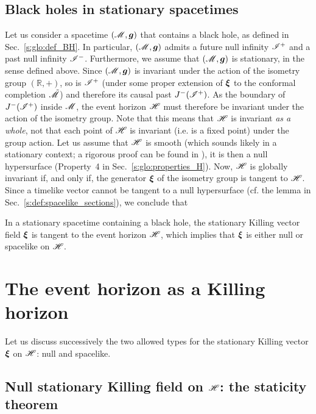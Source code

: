 \subsection{Black holes in stationary spacetimes}

Let us consider a spacetime $(\mathscr{M},\bm{g})$ that contains a black hole, as defined in
Sec.~\ref{s:glo:def_BH}. In particular, $(\mathscr{M},\bm{g})$ admits a future null
infinity $\mathscr{I}^+$ and a past null infinity $\mathscr{I}^-$.
Furthermore, we assume that $(\mathscr{M},\bm{g})$ is stationary, in the sense defined above.
Since $(\mathscr{M},\bm{g})$ is invariant under the action of the isometry group $(\mathbb{R},+)$,
so is $\mathscr{I}^+$ (under some proper extension of $\bm{\xi}$ to the conformal
completion $\tilde{\mathscr{M}}$)
and therefore its causal past $J^-(\mathscr{I}^+)$. As the boundary of $J^-(\mathscr{I}^+)$
inside $\mathscr{M}$, the event horizon $\mathscr{H}$ must therefore be invariant under the
action of the isometry group.
Note that this means that $\mathscr{H}$ is invariant \emph{as a whole}, not that
each point of $\mathscr{H}$ is invariant (i.e. is a fixed point) under the group action.
Let us assume that $\mathscr{H}$ is smooth (which sounds likely in a stationary context;
a rigorous proof can be found in \cite{ChrusDGH01}),
it is then a null hypersurface (Property~4 in Sec.~\ref{s:glo:properties_H}).
Now, $\mathscr{H}$ is globally invariant if, and only if, the
generator $\bm{\xi}$ of the isometry group is tangent to $\mathscr{H}$.
Since a timelike vector cannot be tangent to a null hypersurface (cf. the
lemma in Sec.~\ref{s:def:spacelike_sections}), we conclude that
\begin{greybox}
In a stationary spacetime containing a black hole,
the stationary Killing vector field  $\bm{\xi}$ is tangent to the event horizon
$\mathscr{H}$, which implies that $\bm{\xi}$ is either null or spacelike on $\mathscr{H}$.
\end{greybox}

\section{The event horizon as a Killing horizon} \label{s:sta:EH_KH}

Let us discuss successively the two allowed types for the stationary
Killing vector $\bm{\xi}$ on $\mathscr{H}$: null and spacelike.

\subsection{Null stationary Killing field on $\mathscr{H}$: the staticity theorem}\label{s:sta:staticity_thm}

